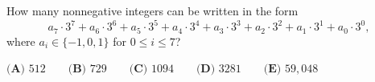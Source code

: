 How many nonnegative integers can be written in the form
\[a_7\cdot3^7+a_6\cdot3^6+a_5\cdot3^5+a_4\cdot3^4+a_3\cdot3^3+a_2\cdot3^2+a_1\cdot3^1+a_0\cdot3^0,\]
where $a_i\in\{-1,0,1\}$ for $0\le i\le7$?

$\textbf{(A) } 512\qquad\textbf{(B) } 729\qquad\textbf{(C) } 1094\qquad\textbf{(D) } 3281\qquad\textbf{(E) } 59{,}048$
